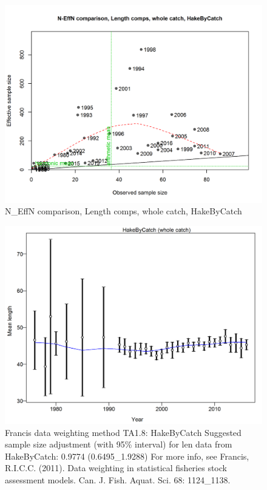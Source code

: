 \documentclass[12pt,]{article}
\begin{document}
\begin{figure}[htbp]
\centering
\includegraphics{./r4ss/plots_mod1/comp_lenfit_sampsize_flt2mkt0.png}
\caption{N\_EffN comparison, Length comps, whole catch, HakeByCatch
\label{fig:mod1_12_comp_lenfit_sampsize_flt2mkt0}}
\end{figure}

\begin{figure}[htbp]
\centering
\includegraphics{./r4ss/plots_mod1/comp_lenfit_data_weighting_TA1.8_HakeByCatch.png}
\caption{Francis data weighting method TA1.8: HakeByCatch Suggested
sample size adjustment (with 95\% interval) for len data from
HakeByCatch: 0.9774 (0.6495\_1.9288) For more info, see Francis,
R.I.C.C. (2011). Data weighting in statistical fisheries stock
assessment models. Can. J. Fish. Aquat. Sci. 68: 1124\_1138.
\label{fig:mod1_13_comp_lenfit_data_weighting_TA1.8_HakeByCatch}}
\end{figure}
\end{document}
